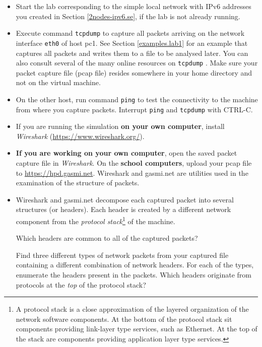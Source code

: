 \documentclass[12pt]{book}
\begin{document}
\begin{itemize}[--]
\item Start the lab corresponding to the simple local network with
  IPv6 addresses you
  created in Section \ref{2nodes-ipv6.se}, if the lab is not already running. 
\item Execute command \verb$tcpdump$ to capture all packets arriving
  on the network interface \verb$eth0$ of host pc1. See Section
  \ref{examples.lab1} for an example that captures all packets and
  writes them to a file to be analysed later. You can also consult
  several of the many online resources on \verb$tcpdump$
  \cite{tcpdump,tcpdump2}. Make sure your packet capture file (pcap
  file) resides somewhere in your home directory and not on the
  virtual machine.
\item On the other host, run command \verb$ping$ to test the
  connectivity to the machine from where you capture
  packets. Interrupt \verb$ping$ and \verb$tcpdump$ with CTRL-C.
\item If you are running the simulation \textbf{on your own computer}, install
  \emph{Wireshark} (\url{https://www.wireshark.org/}). 
\item \textbf{If you are working on your own computer}, open the saved
  packet capture file in \emph{Wireshark}. On the \textbf{school
    computers}, upload your pcap file to
  \url{https://hpd.gasmi.net}. Wireshark and gasmi.net are utilities
  used in the examination of the structure of packets.
\item Wireshark and gasmi.net decompose each captured packet into
  several structures (or headers). Each header is created by a
  different network component from the \emph{protocol
    stack}\footnote{A protocol stack is a close approximation of the
    layered organization of the network software components. At the
    bottom of the protocol stack sit components providing link-layer
    type services, such as Ethernet. At the top of the stack are
    components providing application layer type services.} of the
  machine. 

  Which headers are common to all of the captured packets?

  Find three different types of network packets from your captured
  file containing a different combination of network headers. For each
  of the types, enumerate the headers present in the packets. Which
  headers originate from protocols at the \emph{top} of the protocol
  stack?  
\end{itemize}
\end{document}
